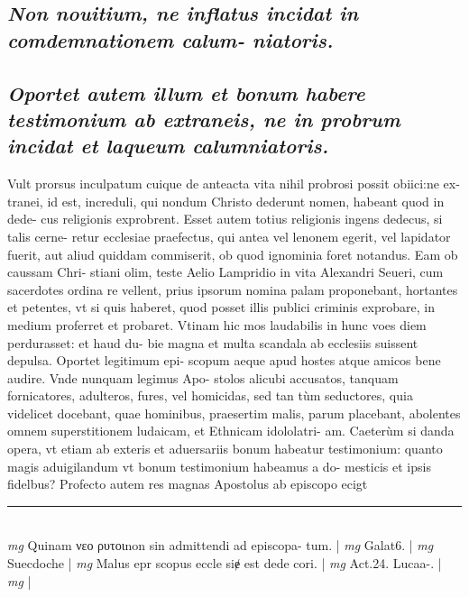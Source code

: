 \documentclass{article}
\begin{document}
\begin{pages}
\subsection*{\textit{Non nouitium, ne inflatus incidat in comdemnationem calum- niatoris. }}
{}
\subsection*{\textit{Oportet autem illum et bonum habere testimonium ab extraneis, ne in probrum incidat et laqueum calumniatoris. }}\pstart Vult prorsus inculpatum cuique de anteacta vita nihil probrosi possit obiici:ne ex- tranei, id est, increduli, qui nondum Christo dederunt nomen, habeant quod in dede- cus religionis exprobrent. Esset autem totius religionis ingens dedecus, si talis cerne- retur ecclesiae praefectus, qui antea vel lenonem egerit, vel lapidator fuerit, aut aliud quiddam commiserit, ob quod ignominia foret notandus. Eam ob caussam Chri- stiani olim, teste Aelio Lampridio in vita Alexandri Seueri, cum sacerdotes ordina re vellent, prius ipsorum nomina palam proponebant, hortantes et petentes, vt si quis haberet, quod posset illis publici criminis exprobare, in medium proferret et probaret. Vtinam hic mos laudabilis in hunc voes diem perdurasset: et haud du- bie magna et multa scandala ab ecclesiis suissent depulsa. Oportet legitimum epi- scopum aeque apud hostes atque amicos bene audire. Vnde nunquam legimus Apo- stolos alicubi accusatos, tanquam fornicatores, adulteros, fures, vel homicidas, sed tan tùm seductores, quia videlicet docebant, quae hominibus, praesertim malis, parum placebant, abolentes omnem superstitionem ludaicam, et Ethnicam idololatri- am. Caeterùm si danda opera, vt etiam ab exteris et aduersariis bonum habeatur testimonium: quanto magis aduigilandum vt bonum testimonium habeamus a do- mesticis et ipsis fidelbus? Profecto autem res magnas Apostolus ab episcopo ecigt  \pend
\vspace{0.5cm}\noindent
\vspace{0.2cm}\rule{1cm}{0.2pt}\\ 
\hspace{0.2cm}\textit{mg}
\footnotesize Quinam νεο ρυτοιnon sin admittendi ad episcopa- tum. 
\normalsize| 
\hspace{0.2cm}\textit{mg}
\footnotesize Galat6. 
\normalsize| 
\hspace{0.2cm}\textit{mg}
\footnotesize Suecdoche 
\normalsize| 
\hspace{0.2cm}\textit{mg}
\footnotesize Malus epr scopus eccle siɇ est dede cori. 
\normalsize| 
\hspace{0.2cm}\textit{mg}
\footnotesize Act.24. Lucaa-. 
\normalsize| 
\hspace{0.2cm}\textit{mg}
\footnotesize 
\normalsize| 

\end{pages}
\end{document}
